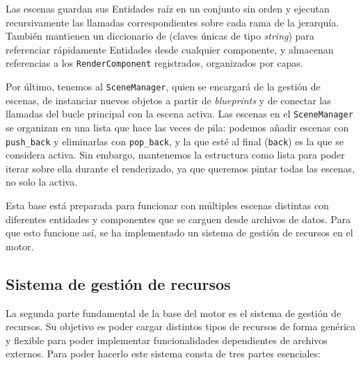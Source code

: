 \medskip

Las escenas guardan sus Entidades raíz en un conjunto sin orden y ejecutan recursivamente las llamadas correspondientes sobre cada rama de la jerarquía. También mantienen un diccionario de  (claves únicas de tipo \textit{string}) para referenciar rápidamente Entidades desde cualquier componente, y almacenan referencias a los \texttt{RenderComponent} registrados, organizados por capas. 

\medskip

Por último, tenemos al \texttt{SceneManager}, quien se encargará de la gestión de escenas, de instanciar nuevos objetos a partir de \textit{blueprints} y de conectar las llamadas del bucle principal con la escena activa. Las escenas en el \texttt{SceneManager} se organizan en una lista que hace las veces de pila: podemos añadir escenas con \texttt{push\_back} y eliminarlas con \texttt{pop\_back}, y la que esté al final (\texttt{back}) es la que se considera activa. Sin embargo, mantenemos la estructura como lista para poder iterar sobre ella durante el renderizado, ya que queremos pintar todas las escenas, no solo la activa.

\medskip

Esta base está preparada para funcionar con múltiples escenas distintas con diferentes entidades y componentes que se carguen desde archivos de datos. Para que esto funcione así, se ha implementado un sistema de gestión de recursos en el motor.

\subsection{Sistema de gestión de recursos}
La segunda parte fundamental de la base del motor es el sistema de gestión de recursos. Su objetivo es poder cargar distintos tipos de recursos de forma genérica y flexible para poder implementar funcionalidades dependientes de archivos externos. Para poder hacerlo este sistema consta de tres partes esenciales: 

